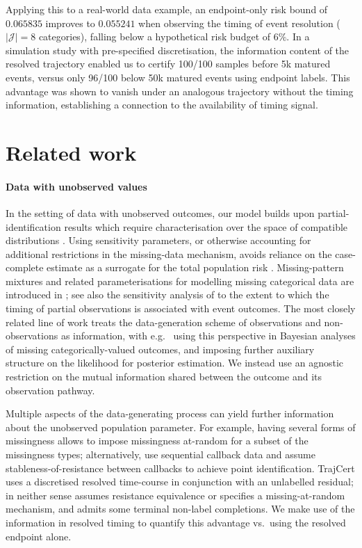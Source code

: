 Applying this to a real-world data example, an endpoint-only risk bound of $0.065835$ improves to $0.055241$ when observing the timing of event resolution ($|\mathcal{J}|=8$ categories), falling below a hypothetical risk budget of $6\%$. In a simulation study with pre-specified discretisation, the information content of the resolved trajectory enabled us to certify 100/100 samples before 5k matured events, versus only 96/100 below 50k matured events using endpoint labels. This advantage was shown to vanish under an analogous trajectory without the timing information, establishing a connection to the availability of timing signal.

\section{Related work}\label{sec:related} 
\paragraph{Data with unobserved values} 
In the setting of data with unobserved outcomes, our model builds upon partial-identification results which require characterisation over the space of compatible distributions \citep{manski2005}. Using sensitivity parameters, or otherwise accounting for additional restrictions in the missing-data mechanism, avoids reliance on the case-complete estimate as a surrogate for the total population risk \citep{carpenter2021}. Missing-pattern mixtures and related parameterisations for modelling missing categorical data are introduced in \citep{little1993}; see also the sensitivity analysis of \citet{shardell2009} to the extent to which the timing of partial observations is associated with event outcomes. The most closely related line of work treats the data-generation scheme of observations and non-observations as information, with e.g.\ \citep{dalygrafstein2026} using this perspective in Bayesian analyses of missing categorically-valued outcomes, and imposing further auxiliary structure on the likelihood for posterior estimation. We instead use an agnostic restriction on the mutual information shared between the outcome and its observation pathway.

Multiple aspects of the data-generating process can yield further information about the unobserved population parameter. For example, having several forms of missingness allows \citet{jiang2018} to impose missingness at-random for a subset of the missingness types; alternatively, \citet{miao2025} use sequential callback data and assume stableness-of-resistance between callbacks to achieve point identification. TrajCert uses a discretised resolved time-course in conjunction with an unlabelled residual; in neither sense assumes resistance equivalence or specifies a missing-at-random mechanism, and admits some terminal non-label completions. We make use of the information in resolved timing to quantify this advantage vs.\ using the resolved endpoint alone.

